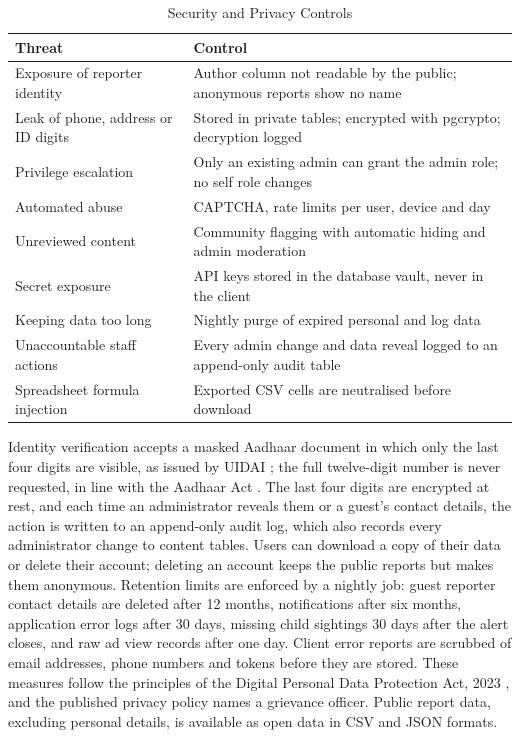 \documentclass[conference]{IEEEtran}
\begin{document}
\begin{table}[htbp]
\caption{Security and Privacy Controls}
\label{tab:4}
\begin{center}
\footnotesize
\begin{tabular}{|>{\raggedright\arraybackslash}p{}|>{\raggedright\arraybackslash}p{}|}
\hline
\textbf{Threat} & \textbf{Control} \\
\hline
Exposure of reporter identity & Author column not readable by the public; anonymous reports show no name \\ \hline
Leak of phone, address or ID digits & Stored in private tables; encrypted with pgcrypto; decryption logged \\ \hline
Privilege escalation & Only an existing admin can grant the admin role; no self role changes \\ \hline
Automated abuse & CAPTCHA, rate limits per user, device and day \\ \hline
Unreviewed content & Community flagging with automatic hiding and admin moderation \\ \hline
Secret exposure & API keys stored in the database vault, never in the client \\ \hline
Keeping data too long & Nightly purge of expired personal and log data \\ \hline
Unaccountable staff actions & Every admin change and data reveal logged to an append-only audit table \\ \hline
Spreadsheet formula injection & Exported CSV cells are neutralised before download \\ \hline
\end{tabular}
\end{center}
\end{table}
Identity verification accepts a masked Aadhaar document in which only the last four digits are visible, as issued by UIDAI \cite{b16}; the full twelve-digit number is never requested, in line with the Aadhaar Act \cite{b17}. The last four digits are encrypted at rest, and each time an administrator reveals them or a guest's contact details, the action is written to an append-only audit log, which also records every administrator change to content tables. Users can download a copy of their data or delete their account; deleting an account keeps the public reports but makes them anonymous. Retention limits are enforced by a nightly job: guest reporter contact details are deleted after 12 months, notifications after six months, application error logs after 30 days, missing child sightings 30 days after the alert closes, and raw ad view records after one day. Client error reports are scrubbed of email addresses, phone numbers and tokens before they are stored. These measures follow the principles of the Digital Personal Data Protection Act, 2023 \cite{b18}, and the published privacy policy names a grievance officer. Public report data, excluding personal details, is available as open data in CSV and JSON formats.
\end{document}
